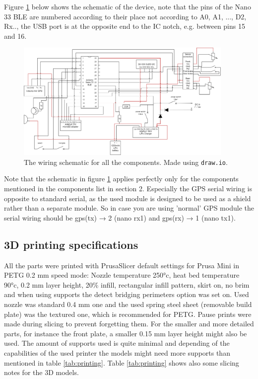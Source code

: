 \documentclass[a4paper,11pt]{article}
\begin{document}
Figure \ref{fig:schematic} below shows the schematic of the device, note that the pins of the Nano 33 BLE are numbered according to their place not according to A0, A1, ..., D2, Rx.., the USB port is at the opposite end to the IC notch, e.g. between pins 15 and 16.

\begin{figure}[H]
    \centering
    \includegraphics[width=105mm]{Figures/schematic.png}
    \caption{The wiring schematic for all the components. Made using \texttt{draw.io}.}
    \label{fig:schematic}
\end{figure}

Note that the schematic in figure \ref{fig:schematic} applies perfectly only for the components mentioned in the components list in section 2. Especially the GPS serial wiring is opposite to standard serial, as the used module is designed to be used as a shield rather than a separate module. So in case you are using 'normal' GPS module the serial wiring should be gps(tx) → 2 (nano rx1) and gps(rx) → 1 (nano tx1).


\subsection{3D printing specifications}

All the parts were printed with PrusaSlicer default settings for Prusa Mini in PETG 0.2 mm speed mode: Nozzle temperature 250°c, heat bed temperature 90°c, 0.2 mm layer height, 20\% infill, rectangular infill pattern, skirt on, no brim and when using supports the detect bridging perimeters option was set on. Used nozzle was standard 0.4 mm one and the used spring steel sheet (removable build plate) was the textured one, which is recommended for PETG. Pause prints were made during slicing to prevent forgetting them. For the smaller and more detailed parts, for instance the front plate, a smaller 0.15 mm layer height might also be used. The amount of supports used is quite minimal and depending of the capabilities of the used printer the models might need more supports than mentioned in table \ref{tab:printing}. Table \ref{tab:printing} shows also some slicing notes for the 3D models.
\end{document}
